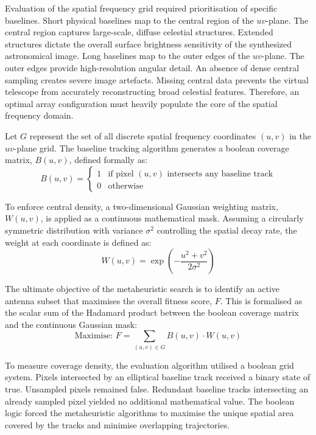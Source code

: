 \documentclass[conference]{IEEEtran}
\begin{document}
Evaluation of the spatial frequency grid required prioritisation of specific baselines. Short physical 
baselines map to the central region of the $uv$-plane. The central region captures large-scale, diffuse 
celestial structures. Extended structures dictate the overall surface brightness sensitivity of the 
synthesized astronomical image. Long baselines map to the outer edges of the $uv$-plane. The outer edges 
provide high-resolution angular detail. An absence of dense central sampling creates severe image artefacts. 
Missing central data prevents the virtual telescope from accurately reconstructing broad celestial features. 
Therefore, an optimal array configuration must heavily populate the core of the spatial frequency domain.

Let $G$ represent the set of all discrete spatial frequency coordinates $(u, v)$ in the $uv$-plane grid. The baseline tracking algorithm generates a boolean coverage matrix, $B(u,v)$, defined formally as:
\begin{equation}
B(u,v) = 
\begin{cases} 
1 & \text{if pixel } (u,v) \text{ intersects any baseline track} \\ 
0 & \text{otherwise} 
\end{cases}
\end{equation}

To enforce central density, a two-dimensional Gaussian weighting matrix, $W(u,v)$, is applied as a continuous mathematical mask. Assuming a circularly symmetric distribution with variance $\sigma^2$ controlling the spatial decay rate, the weight at each coordinate is defined as:
\begin{equation}
W(u,v) = \exp\left(-\frac{u^2 + v^2}{2\sigma^2}\right)
\end{equation}

The ultimate objective of the metaheuristic search is to identify an active antenna subset that maximises the overall fitness score, $F$. This is formalised as the scalar sum of the Hadamard product between the boolean coverage matrix and the continuous Gaussian mask:
\begin{equation}
\text{Maximise: } F = \sum_{(u,v) \in G} B(u,v) \cdot W(u,v)
\end{equation}

To measure coverage density, the evaluation algorithm utilised a boolean grid system. Pixels intersected by an 
elliptical baseline track received a binary state of true. Unsampled pixels remained false. Redundant baseline 
tracks intersecting an already sampled pixel yielded no additional mathematical value. The boolean logic forced 
the metaheuristic algorithms to maximise the unique spatial area covered by the tracks and minimise overlapping trajectories. 
\end{document}
